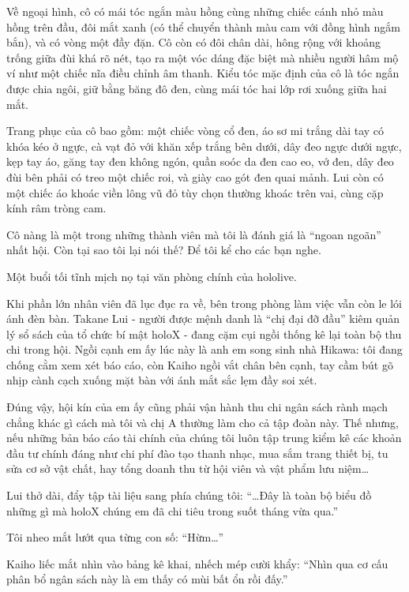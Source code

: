 \documentclass[../main.tex]{subfiles}
\begin{document}
Về ngoại hình, cô có mái tóc ngắn màu hồng cùng những chiếc cánh nhỏ màu hồng trên đầu, đôi mắt xanh (có thể chuyển thành màu cam với đồng hình ngắm bắn), và có vòng một đầy đặn. Cô còn có đôi chân dài, hông rộng với khoảng trống giữa đùi khá rõ nét, tạo ra một vóc dáng đặc biệt mà nhiều người hâm mộ ví như một chiếc nĩa điều chỉnh âm thanh. Kiểu tóc mặc định của cô là tóc ngắn được chia ngôi, giữ bằng băng đô đen, cùng mái tóc hai lớp rơi xuống giữa hai mắt.

Trang phục của cô bao gồm: một chiếc vòng cổ đen, áo sơ mi trắng dài tay có khóa kéo ở ngực, cà vạt đỏ với khăn xếp trắng bên dưới, dây đeo ngực dưới ngực, kẹp tay áo, găng tay đen không ngón, quần soóc da đen cao eo, vớ đen, dây đeo đùi bên phải có treo một chiếc roi, và giày cao gót đen quai mảnh. Lui còn có một chiếc áo khoác viền lông vũ đỏ tùy chọn thường khoác trên vai, cùng cặp kính râm tròng cam.

\chrint

Cô nàng là một trong những thành viên mà tôi là đánh giá là ``ngoan ngoãn'' nhất hội. Còn tại sao tôi lại nói thế? Để tôi kể cho các bạn nghe.

\il

Một buổi tối tĩnh mịch nọ tại văn phòng chính của hololive.

Khi phần lớn nhân viên đã lục đục ra về, bên trong phòng làm việc vẫn còn le lói ánh đèn bàn. Takane Lui - người được mệnh danh là ``chị đại đỡ đầu'' kiêm quản lý sổ sách của tổ chức bí mật holoX - đang cặm cụi ngồi thống kê lại toàn bộ thu chi trong hội. Ngồi cạnh em ấy lúc này là anh em song sinh nhà Hikawa: tôi đang chống cằm xem xét báo cáo, còn Kaiho ngồi vắt chân bên cạnh, tay cầm bút gõ nhịp cành cạch xuống mặt bàn với ánh mắt sắc lẹm đầy soi xét.


Đúng vậy, hội kín của em ấy cũng phải vận hành thu chi ngân sách rành mạch chẳng khác gì cách mà tôi và chị A thường làm cho cả tập đoàn này. Thế nhưng, nếu những bản báo cáo tài chính của chúng tôi luôn tập trung kiểm kê các khoản đầu tư chính đáng như chi phí đào tạo thanh nhạc, mua sắm trang thiết bị, tu sửa cơ sở vật chất, hay tổng doanh thu từ hội viên và vật phẩm lưu niệm\dots

Lui thở dài, đẩy tập tài liệu sang phía chúng tôi: ``\dots Đây là toàn bộ biểu đồ những gì mà holoX chúng em đã chi tiêu trong suốt tháng vừa qua.''

Tôi nheo mắt lướt qua từng con số: ``Hừm\dots''

Kaiho liếc mắt nhìn vào bảng kê khai, nhếch mép cười khẩy: ``Nhìn qua cơ cấu phân bổ ngân sách này là em thấy có mùi bất ổn rồi đấy.''
\end{document}
